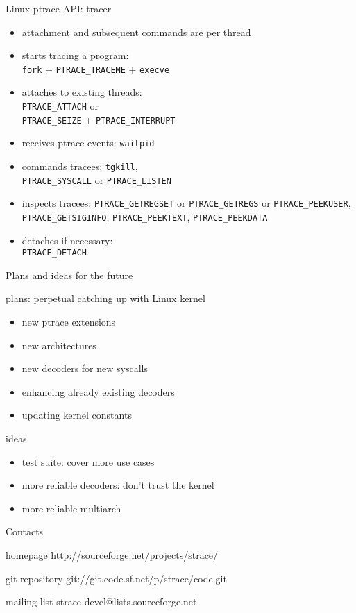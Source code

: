 \documentclass[unicode]{beamer}
\begin{document}
\begin{frame}{Linux ptrace API: tracer}
	\begin{itemize}
		\item attachment and subsequent commands are per thread
		\item starts tracing a program: \\
			{\tt fork} + {\tt PTRACE\_TRACEME} + {\tt execve}
		\item attaches to existing threads: \\
			{\tt PTRACE\_ATTACH} or \\
			{\tt PTRACE\_SEIZE} + {\tt PTRACE\_INTERRUPT}
		\item receives ptrace events: {\tt waitpid}
		\item commands tracees: {\tt tgkill}, \\
			{\tt PTRACE\_SYSCALL} or {\tt PTRACE\_LISTEN}
		\item inspects tracees:
			{\tt PTRACE\_GETREGSET} or {\tt PTRACE\_GETREGS} or {\tt PTRACE\_PEEKUSER}, \\
			{\tt PTRACE\_GETSIGINFO}, {\tt PTRACE\_PEEKTEXT}, {\tt PTRACE\_PEEKDATA}
		\item detaches if necessary: \\
			{\tt PTRACE\_DETACH}
	\end{itemize}
\end{frame}

\begin{frame}{Plans and ideas for the future}
	\begin{block}{plans: perpetual catching up with Linux kernel}
		\begin{itemize}
			\item new ptrace extensions
			\item new architectures
			\item new decoders for new syscalls
			\item enhancing already existing decoders
			\item updating kernel constants
		\end{itemize}
	\end{block}
	\bigskip
	\begin{block}{ideas}
		\begin{itemize}
			\item test suite: cover more use cases
			\item more reliable decoders: don't trust the kernel
			\item more reliable multiarch
		\end{itemize}
	\end{block}
\end{frame}

\begin{frame}{Contacts}
\begin{block}{homepage}
	http://sourceforge.net/projects/strace/
\end{block}
\begin{block}{git repository}
	git://git.code.sf.net/p/strace/code.git
\end{block}
\begin{block}{mailing list}
	strace-devel@lists.sourceforge.net
\end{block}
\end{frame}
\end{document}

